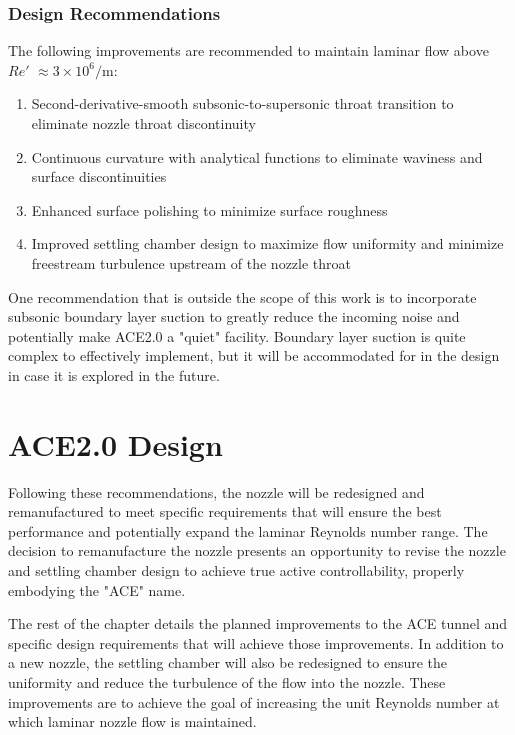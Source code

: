 \subsubsection*{Design Recommendations}

The following improvements are recommended to maintain laminar flow above $Re'$ $\approx 3 \times 10^6/\mathrm{m}$:
\begin{enumerate}
    \item Second-derivative-smooth subsonic-to-supersonic throat transition to eliminate nozzle throat discontinuity
    \item Continuous curvature with analytical functions to eliminate waviness and surface discontinuities
    \item Enhanced surface polishing to minimize surface roughness
    \item Improved settling chamber design to maximize flow uniformity and minimize freestream turbulence upstream of the nozzle throat
\end{enumerate}

One recommendation that is outside the scope of this work is to incorporate subsonic boundary layer suction to greatly reduce the incoming noise and potentially make ACE2.0 a "quiet" facility. Boundary layer suction is quite complex to effectively implement, but it will be accommodated for in the design in case it is explored in the future. 

\section{ACE2.0 Design}

Following these recommendations, the nozzle will be redesigned and remanufactured to meet specific requirements that will ensure the best performance and potentially expand the laminar Reynolds number range. The decision to remanufacture the nozzle presents an opportunity to revise the nozzle and settling chamber design to achieve true active controllability, properly embodying the "ACE" name.

The rest of the chapter details the planned improvements to the ACE tunnel and specific design requirements that will achieve those improvements. In addition to a new nozzle, the settling chamber will also be redesigned to ensure the uniformity and reduce the turbulence of the flow into the nozzle. These improvements are to achieve the goal of increasing the unit Reynolds number at which laminar nozzle flow is maintained.

